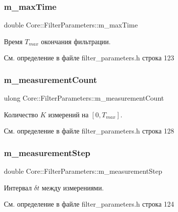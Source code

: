 \subsubsection{\texorpdfstring{m\+\_\+max\+Time}{m\_maxTime}}
{\footnotesize\ttfamily double Core\+::\+Filter\+Parameters\+::m\+\_\+max\+Time\hspace{0.3cm}{\ttfamily [private]}}

Время $T_{max}$ окончания фильтрации. 

См. определение в файле filter\+\_\+parameters.\+h строка 123

\hypertarget{class_core_1_1_filter_parameters_a931e9e09796c055d6c28d7c93d3121d9}{}\label{class_core_1_1_filter_parameters_a931e9e09796c055d6c28d7c93d3121d9} 
\subsubsection{\texorpdfstring{m\+\_\+measurement\+Count}{m\_measurementCount}}
{\footnotesize\ttfamily ulong Core\+::\+Filter\+Parameters\+::m\+\_\+measurement\+Count\hspace{0.3cm}{\ttfamily [private]}}

Количество $K$ измерений на $[0, T_{max}]$. 

См. определение в файле filter\+\_\+parameters.\+h строка 128

\hypertarget{class_core_1_1_filter_parameters_a68b0fe638b3a00a16cfa07f7d6a229fb}{}\label{class_core_1_1_filter_parameters_a68b0fe638b3a00a16cfa07f7d6a229fb} 
\subsubsection{\texorpdfstring{m\+\_\+measurement\+Step}{m\_measurementStep}}
{\footnotesize\ttfamily double Core\+::\+Filter\+Parameters\+::m\+\_\+measurement\+Step\hspace{0.3cm}{\ttfamily [private]}}

Интервал $\delta t$ между измерениями. 

См. определение в файле filter\+\_\+parameters.\+h строка 124


